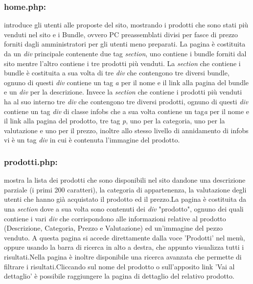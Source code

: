  \subsubsection{home.php:} \Spazio introduce gli utenti alle proposte del sito, mostrando i prodotti che sono stati più venduti nel sito e i Bundle, ovvero PC preassemblati divisi per fasce di prezzo forniti dagli amministratori per gli utenti meno preparati. \newline
 La pagina è costituita da un \emph{div} principale contenente due tag \emph{section}, uno contiene i bundle forniti dal sito mentre l'altro contiene i tre prodotti più venduti. \newline
 La \emph{section} che contiene i bundle è costituita a sua volta di tre \emph{div} che contengono tre diversi bundle, ognuno di questi \emph{div} contiene un tag \emph{a} per il nome e il link alla pagina del bundle e un \emph{div} per la descrizione.\newline
 Invece la \emph{section} che contiene i prodotti più venduti ha al suo interno tre \emph{div} che contengono tre diversi prodotti, ognuno di questi \emph{div} contiene un tag \emph{div} di classe infobs che a sua volta contiene un tag\emph{a} per il nome e il link alla pagina del prodotto, tre tag \emph{p}, uno per la categoria, uno per la valutazione e uno per il prezzo, inoltre allo stesso livello di annidamento di infobs vi è un tag \emph{div} in cui è contenuta l'immagine del prodotto.
 
\subsubsection{prodotti.php:} \Spazio mostra la lista dei prodotti che sono disponibili nel sito dandone una descrizione parziale (i primi 200 caratteri), la categoria di appartenenza, la valutazione degli utenti che hanno già acquistato il prodotto ed il prezzo.\newline La pagina è costituita da una \emph{section} dove a sua volta sono contenuti dei \emph{div} "prodotto", ognuno dei quali contiene i vari \emph{div} che corrispondono alle informazioni relative al prodotto (Descrizione, Categoria, Prezzo e Valutazione) ed un'immagine del pezzo venduto. A questa pagina si accede direttamente dalla voce 'Prodotti' nel menù, oppure usando la barra di ricerca in alto a destra, che appunto visualizza tutti i risultati.\newline Nella pagina è inoltre disponibile una ricerca avanzata che permette di filtrare i risultati.\newline Cliccando sul nome del prodotto o sull'apposito link 'Vai al dettaglio' è possibile raggiungere la pagina di dettaglio del relativo prodotto.

